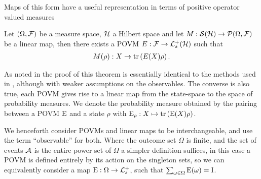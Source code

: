 Maps of this form have a useful representation in terms of positive operator valued measures

\begin{thm}
  Let $(\Omega,\mathcal{F})$ be a measure space, $\mathcal{H}$ a Hilbert space and let $M:\dops[\hcal]\to\probs{\Omega}{\fcal}$ be a linear map, then there exists a POVM $E:\fcal\to\posops[\hcal]$ such that
  \begin{align}
    M(\rho):X\to \operatorname{tr}\left( E(X)\rho \right).
  \end{align}
\end{thm}
As noted in \cite{quantum-measurement-busch-et-al} the proof of this theorem is essentially identical to the methods used in \cite{Neumann1927}, although with weaker assumptions on the observables. The converse is also true, each POVM gives rise to a linear map from the state-space to the space of probability measures. We denote the probability measure obtained by the pairing between a POVM $\operatorname{E}$ and a state $\rho$ with $\operatorname{E}_\rho:X\mapsto \operatorname{tr}\left( \operatorname{E}(X)\rho \right)$.

We henceforth consider POVMs and linear maps to be interchangeable, and use the term ``observable'' for both. Where the outcome set $\Omega$ is finite, and the set of events $\mathcal{A}$ is the entire power set of $\Omega$ a simpler definition suffices, in this case a POVM is defined entirely by its action on the singleton sets, so we can equivalently consider a map $\ope:\Omega\to\posops$, such that $\sum_{\omega\in\Omega} \operatorname{E}(\omega) = \operatorname{I}$.


